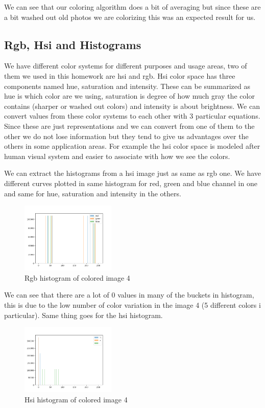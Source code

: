 \documentclass[conference]{IEEEtran}
\begin{document}
We can see that our coloring algorithm does a bit of averaging but since these are a bit washed out old photos we are colorizing this was an expected result for us.

\subsection{Rgb, Hsi and Histograms}
We have different color systems for different purposes and usage areas, two of them we used in this homework are hsi and rgb. Hsi color space has three components named hue, saturation and intensity. These can be summarized as hue is which color are we using, saturation is  degree of how much gray the color contains (sharper or washed out colors) and intensity is about brightness. We can convert values from these color systems to each other with 3 particular equations. Since these are just representations and we can convert from one of them to the other we do not lose information but they tend to give us advantages over the others in some application areas. For example the hsi color space is modeled after human visual system and easier to associate with how we see the colors. 

We can extract the histograms from a hsi image just as same as rgb one. We have different curves plotted in same histogram for red, green and blue channel in one and same for hue, saturation and intensity in the others. 

\begin{figure}[H]
    \centering
    \includegraphics[width=0.4\textwidth]{resources/4_rgb_histogram.png}
    \caption{Rgb histogram of colored image 4}
    \label{fig:image_4_rgb_histogram}
\end{figure}

We can see that there are a lot of 0 values in many of the buckets in histogram, this is due to the low number of color variation in the image 4 (5 different colors i particular). Same thing goes for the hsi histogram.

\begin{figure}[H]
    \centering
    \includegraphics[width=0.4\textwidth]{resources/4_hsi_histogram.png}
    \caption{Hsi histogram of colored image 4}
    \label{fig:image_4_rgb_histogram}
\end{figure}
\end{document}
